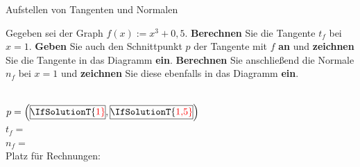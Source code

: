 \documentclass[
    ngerman,
    color=1b,
    load_common,
    leqno,
    boxarc,
    solution=true,
]{rubos-tuda-template}
\begin{document}
\begin{task}[points=5]{Aufstellen von Tangenten und Normalen}
    \def\coordinatesystemradius{4}
    \begin{grayInfoBox}
        Gegeben sei der Graph $f(x):=x^3+0,5$. 
        \textbf{Berechnen} Sie die Tangente $t_f$ bei $x=1$. 
        \textbf{Geben} Sie auch den Schnittpunkt $p$ der Tangente mit $f$ \textbf{an} und \textbf{zeichnen} Sie die Tangente in das Diagramm \textbf{ein}.
        \textbf{Berechnen} Sie anschließend die Normale $n_f$ bei $x=1$ und \textbf{zeichnen} Sie diese ebenfalls in das Diagramm \textbf{ein}.
    \end{grayInfoBox}
    \begin{minipage}[t]{.5\textwidth}
        \mbox{}\\[1em]
        $p=\left(\tikz[baseline=-.1cm]{\node[inner sep=0pt, minimum width=1cm, minimum height=.5cm, draw]{\IfSolutionT{\color{red}1}};}, \tikz[baseline=-.1cm]{\node[inner sep=0pt, minimum width=1cm, minimum height=.5cm, draw]{\IfSolutionT{\color{red}1,5}};}\right)$\\[2em]
        $t_f=$~
        \dotfill\\[2em]
        $n_f=$~
        \dotfill\\[1em]
        Platz für Rechnungen:
\end{minipage}
\end{task}
\end{document}
